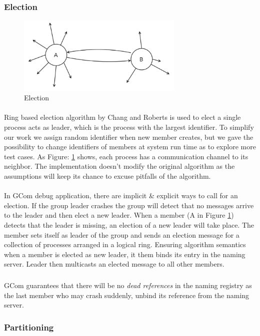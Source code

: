 \documentclass[a4paper,english,twoside]{article}
\begin{document}
\subsubsection{Election}
\begin{figure}[h]
\centering \includegraphics[width=300px]{Election.png}
\caption{Election}
\label{fig:election}
\end{figure}
\paragraph{}
Ring based election algorithm by Chang and Roberts is used to elect a single process acts as leader, which is the process with the largest identifier. To simplify our work we assign random identifier when new member creates, but we gave the possibility to change identifiers of members at system run time as to explore more test cases. As Figure: \ref{fig:election} shows, each process has a communication channel to its neighbor. The implementation doesn't modify the original algorithm as the assumptions will keep its chance to excuse pitfalls of the algorithm. 
\paragraph{}
In GCom debug application, there are implicit \& explicit ways to call for an election. If the group leader crashes the group will detect that no messages arrive to the leader and then elect a new leader. When a member (A in Figure \ref{fig:election}) detects that the leader is missing, an election of a new leader will take place. The member sets itself as leader of the group and sends
an election message for a collection of processes arranged in a logical ring. Ensuring algorithm semantics when a member is elected as new leader, it them binds its entry in the naming server. Leader then multicasts an elected message to all other members. 
\subparagraph{}
GCom guarantees that there will be no \emph{dead references} in the naming registry as the last member who may crash suddenly, unbind its reference from the naming server.

\subsubsection{Partitioning}
\end{document}
